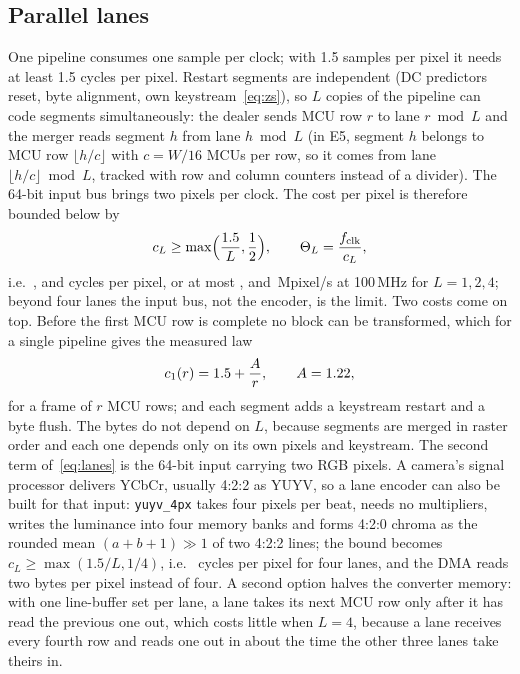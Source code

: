 \subsection{Parallel lanes}\label{sec:lanes}
One pipeline consumes one sample per clock; with 1.5 samples per pixel it needs at least 1.5 cycles per pixel. Restart segments are independent (DC predictors reset, byte alignment, own keystream~\eqref{eq:zs}), so $L$ copies of the pipeline can code segments simultaneously: the dealer sends MCU row $r$ to lane $r \bmod L$ and the merger reads segment $h$ from lane $h \bmod L$ (in E5, segment $h$ belongs to MCU row $\lfloor h/c \rfloor$ with $c = W/16$ MCUs per row, so it comes from lane $\lfloor h/c \rfloor \bmod L$, tracked with row and column counters instead of a divider). The 64-bit input bus brings two pixels per clock. The cost per pixel is therefore bounded below by
\begin{equation}
c_L \ge \max\Bigl(\frac{1.5}{L}, \frac{1}{2}\Bigr), \qquad \Theta_L = \frac{f_{\mathrm{clk}}}{c_L},
\label{eq:lanes}
\end{equation}
i.e.\ \BoundOneCpp, \BoundTwoCpp{} and \BoundFourCpp{} cycles per pixel, or at most \BoundOneMpix, \BoundTwoMpix{} and \BoundFourMpix\,Mpixel/s at 100\,MHz for $L = 1, 2, 4$; beyond four lanes the input bus, not the encoder, is the limit. Two costs come on top. Before the first MCU row is complete no block can be transformed, which for a single pipeline gives the measured law
\begin{equation}
c_1(r) = 1.5 + \frac{A}{r}, \qquad A = 1.22,
\label{eq:fill}
\end{equation}
for a frame of $r$ MCU rows; and each segment adds a keystream restart and a byte flush. The bytes do not depend on $L$, because segments are merged in raster order and each one depends only on its own pixels and keystream. The second term of~\eqref{eq:lanes} is the 64-bit input carrying two RGB pixels. A camera's signal processor delivers YCbCr, usually 4:2:2 as YUYV, so a lane encoder can also be built for that input: \texttt{yuyv\_4px} takes four pixels per beat, needs no multipliers, writes the luminance into four memory banks and forms 4:2:0 chroma as the rounded mean $(a+b+1)\gg 1$ of two 4:2:2 lines; the bound becomes $c_L \ge \max(1.5/L, 1/4)$, i.e.\ \BoundYuyvFourCpp{} cycles per pixel for four lanes, and the DMA reads two bytes per pixel instead of four. A second option halves the converter memory: with one line-buffer set per lane, a lane takes its next MCU row only after it has read the previous one out, which costs little when $L = 4$, because a lane receives every fourth row and reads one out in about the time the other three lanes take theirs in.

